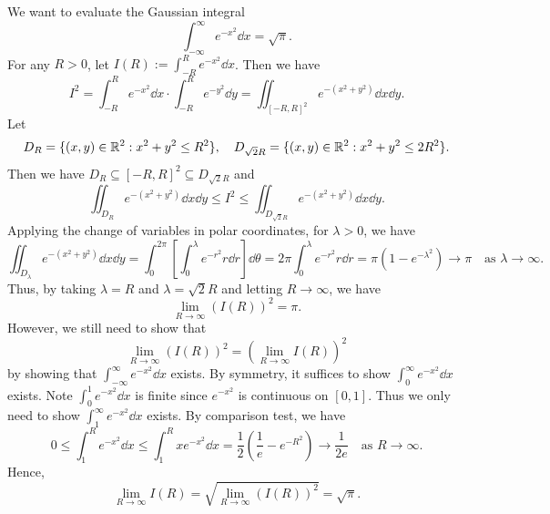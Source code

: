 \begin{exampleenv}
    We want to evaluate the Gaussian integral
    $$
    \int_{-\infty}^{\infty} e^{-x^2} \dd x = \sqrt{\pi}.
    $$
    For any $R > 0$, let $I(R) := \displaystyle \int_{-R}^R e^{-x^2} \dd x$. Then we have
    $$
    I^2 = \int_{-R}^R e^{-x^2} \dd x \cdot \int_{-R}^R e^{-y^2} \dd y = \iint_{[-R,R]^2} e^{-(x^2+y^2)} \dd x \dd y.
    $$
    Let
    $$ D_R = \{(x,y) \in \mathbb{R}^2 : x^2 + y^2 \leq R^2\},\quad D_{\sqrt{2}R} = \{(x,y) \in \mathbb{R}^2 : x^2 + y^2 \leq 2R^2\}. $$
    Then we have $D_R \subseteq [-R,R]^2 \subseteq D_{\sqrt{2}R}$ and
    \[
    \iint_{D_R} e^{-(x^2+y^2)} \dd x \dd y \leq I^2 \leq \iint_{D_{\sqrt{2}R}} e^{-(x^2+y^2)} \dd x \dd y.
    \]
    Applying the change of variables in polar coordinates, for $\lambda > 0$, we have
    \[
    \iint_{D_\lambda} e^{-(x^2+y^2)} \dd x \dd y = \int_0^{2\pi} \left[ \int_0^\lambda e^{-r^2} r \dd r \right] \dd \theta = 2\pi \int_0^\lambda e^{-r^2} r \dd r = \pi (1 - e^{-\lambda^2})\to \pi \quad \text{as } \lambda \to \infty.
    \]
    Thus, by taking $\lambda = R$ and $\lambda = \sqrt{2}R$ and letting $R \to \infty$, we have
    \[
    \lim_{R \to \infty} (I(R))^2 = \pi.
    \]
    However, we still need to show that
    $$ \lim_{R \to \infty} (I(R))^2 = \left( \lim_{R \to \infty} I(R) \right)^2 $$
    by showing that $\displaystyle \int_{-\infty}^{\infty} e^{-x^2} \dd x$ exists. By symmetry, it suffices to show $\displaystyle \int_0^{\infty} e^{-x^2} \dd x$ exists. Note $\displaystyle \int_0^1 e^{-x^2} \dd x$ is finite since $e^{-x^2}$ is continuous on $[0,1]$. Thus we only need to show $\displaystyle \int_1^{\infty} e^{-x^2} \dd x$ exists. By comparison test, we have
    \[
    0 \le \int_1^R e^{-x^2} \dd x \le \int_1^R xe^{-x^2} \dd x = \frac{1}{2} (\frac1e - e^{-R^2}) \to \frac{1}{2e} \quad \text{as } R \to \infty.
    \]
    Hence,
    $$ \lim_{R \to \infty} I(R) = \sqrt{\lim_{R \to \infty} (I(R))^2} = \sqrt{\pi}. $$
\end{exampleenv}

